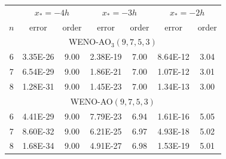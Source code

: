 \documentclass[11pt,landscape,usenames,dvipsnames,letterpaper,leqno]{article}
\def\Maroon{\textcolor{mymaroon}}
\newcommand\subhead[1]{\smallskip{\it\Maroon{#1}}}
\begin{document}
{{\footnotesize
\subhead{WENO-Z weights} 
\scriptsize 
\begin{tabular}{c|c c| c c| c c }
    \hline
        & \multicolumn{2}{c|}{$x_{\ast} = -4h$} & \multicolumn{2}{c|}{$x_{\ast} = -3h$} & \multicolumn{2}{c}{$x_{\ast} = -2h$}\\
     $n$   & error  &order       & error & order   & error &  order  \\
    \hline
     \multicolumn{7}{c}{WENO-AO$_3(9,7,5,3)$}\\
    \hline
    6 &  3.35E-26 &  9.00 &  2.38E-19 &  7.00 &  8.64E-12 &  3.04 \\
    7 &  6.54E-29 &  9.00 &  1.86E-21 &  7.00 &  1.07E-12 &  3.01 \\
    8 &  1.28E-31 &  9.00 &  1.45E-23 &  7.00 &  1.34E-13 &  3.00 \\
    \hline
     \multicolumn{7}{c}{WENO-AO$(9,7,5,3)$}\\
    \hline
    6 &  4.41E-29 &  9.00 &  7.79E-23 &  6.94 &  1.61E-16 &  5.05 \\
    7 &  8.60E-32 &  9.00 &  6.21E-25 &  6.97 &  4.93E-18 &  5.02 \\
    8 &  1.68E-34 &  9.00 &  4.91E-27 &  6.98 &  1.53E-19 &  5.01 \\
    \hline
  \end{tabular}



}}
\end{document}

